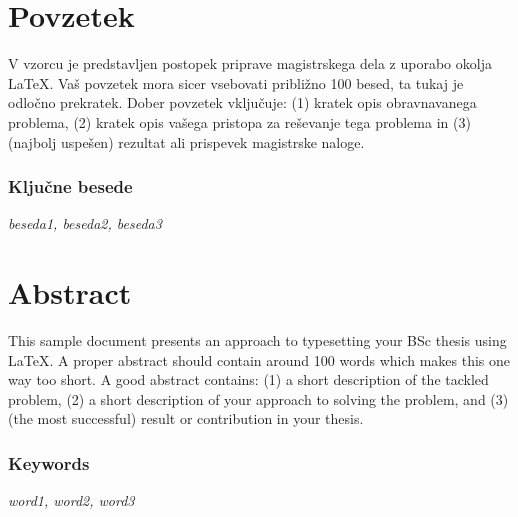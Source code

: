 \documentclass[a4paper, 12pt]{book}
\begin{document}
	
\chapter{Povzetek}

V vzorcu je predstavljen postopek priprave magistrskega dela z uporabo okolja \LaTeX. Vaš povzetek mora sicer vsebovati približno 100 besed, ta tukaj je odločno prekratek. Dober povzetek vključuje: (1) kratek opis obravnavanega problema, (2) kratek opis vašega pristopa za reševanje tega problema in (3) (najbolj uspešen) rezultat ali prispevek magistrske naloge.

\subsection*{Ključne besede}
\textit{beseda1, beseda2, beseda3}
\clearemptydoublepage



\chapter{Abstract}

This sample document presents an approach to typesetting your BSc thesis using \LaTeX. A proper abstract should contain around 100 words which makes this one way too short. A good abstract contains: (1) a short description of the tackled problem, (2) a short description of your approach to solving the problem, and (3) (the most successful) result or contribution in your thesis.

\subsection*{Keywords}
\textit{word1, word2, word3}
\clearemptydoublepage



\mainmatter 
\pagestyle{mainmatter}
\end{document}

